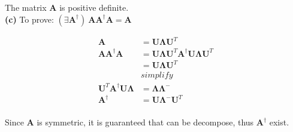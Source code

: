 \documentclass[11pt]{article}
\begin{document}
The matrix \textbf{A} is positive definite.\\

\noindent\textbf{(c)}
To prove: $(\exists \textbf{A}^\dagger)\ \textbf{AA}^\dagger \textbf{A} = \textbf{A}$

\begin{equation} \label{eq8}
\begin{split}
\textbf{A}&=\textbf{U}\pmb{\Lambda}\textbf{U}^T\\
\textbf{AA}^\dagger \textbf{A}&=\textbf{U}\pmb{\Lambda}\textbf{U}^T\textbf{A}^\dagger\textbf{U}\pmb{\Lambda}\textbf{U}^T\\
&=\textbf{U}\pmb{\Lambda}\textbf{U}^T\\
&simplify\\
\textbf{U}^T\textbf{A}^\dagger\textbf{U}\pmb{\Lambda}&=\pmb{\Lambda}\pmb{\Lambda}^-\\
\textbf{A}^\dagger&=\textbf{U}\pmb{\Lambda}^{-}\textbf{U}^T\\
\end{split}
\end{equation}

Since \textbf{A} is symmetric, it is guaranteed that can be decompose,
thus $\textbf{A}^\dagger$ exist.
\end{document}
